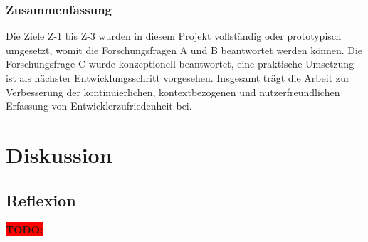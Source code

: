 \documentclass[12pt,a4paper]{report}
\newcommand{\todo}[1]{\colorbox{red}{\textbf{TODO: #1}}\\}
\begin{document}
    \subsection*{Zusammenfassung}
    Die Ziele Z-1 bis Z-3 wurden in diesem Projekt vollständig oder prototypisch umgesetzt, womit die Forschungsfragen
    A und B beantwortet werden können. Die Forschungsfrage C wurde konzeptionell beantwortet, eine praktische Umsetzung
    ist als nächster Entwicklungsschritt vorgesehen. Insgesamt trägt die Arbeit zur Verbesserung der kontinuierlichen,
    kontextbezogenen und nutzerfreundlichen Erfassung von Entwicklerzufriedenheit bei.



\chapter{Diskussion}
\section{Reflexion}
\todo{}

\printbibliography
\end{document}
